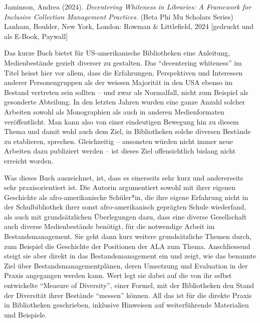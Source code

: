 \documentclass[a4paper,
fontsize=11pt,
oneside,
numbers=noperiodatend,
parskip=half-,
bibliography=totoc,
final
]{scrartcl}
\begin{document}
Jaminson, Andrea (2024). \emph{Decentering Whiteness in Libraries: A
Framework for Inclusive Collection Management Practices.} (Beta Phi Mu
Scholars Series) Lanham, Boulder, New York, London: Rowman \&
Littlefield, 2024 {[}gedruckt und als E-Book, Paywall{]}

Das kurze Buch bietet für US-amerikanische Bibliotheken eine Anleitung,
Medienbestände gezielt diverser zu gestalten. Das \enquote{decentering
whiteness} im Titel heisst hier vor allem, dass die Erfahrungen,
Perspektiven und Interessen anderer Personengruppen als der weissen
Majorität in den USA ebenso im Bestand vertreten sein sollten -- und
zwar als Normalfall, nicht zum Beispiel als gesonderte Abteilung. In den
letzten Jahren wurden eine ganze Anzahl solcher Arbeiten sowohl als
Monographien als auch in anderen Medienformaten veröffentlicht. Man kann
also von einer eindeutigen Bewegung hin zu diesem Thema und damit wohl
auch dem Ziel, in Bibliotheken solche diversen Bestände zu etablieren,
sprechen. Gleichzeitig -- ansonsten würden nicht immer neue Arbeiten
dazu publiziert werden -- ist dieses Ziel offensichtlich bislang nicht
erreicht worden.

Was dieses Buch auszeichnet, ist, dass es einerseits sehr kurz und
andererseits sehr praxisorientiert ist. Die Autorin argumentiert sowohl
mit ihrer eigenen Geschichte als afro-amerikanische Schüler*in, die ihre
eigene Erfahrung nicht in der Schulbibliothek ihrer sonst
afro-amerikanisch geprägten Schule wiederfand, als auch mit
grundsätzlichen Überlegungen dazu, dass eine diverse Gesellschaft auch
diverse Medienbestände benötigt, für die notwendige Arbeit im
Bestandsmanagement. Sie geht dann kurz weitere grundsätzliche Themen
durch, zum Beispiel die Geschichte der Positionen der ALA zum Thema.
Anschliessend steigt sie aber direkt in das Bestandsmanagement ein und
zeigt, wie das benannte Ziel über Bestandsmanagementplänen, deren
Umsetzung und Evaluation in der Praxis angegangen werden kann. Wert legt
sie dabei auf die von ihr selbst entwickelte \enquote{Measure of
Diversity}, einer Formel, mit der Bibliotheken den Stand der Diversität
ihrer Bestände \enquote{messen} können. All das ist für die direkte
Praxis in Bibliotheken geschrieben, inklusive Hinweisen auf
weiterführende Materialien und Beispiele.
\end{document}

